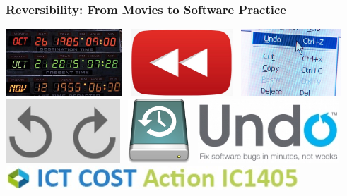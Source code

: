 \documentclass[12pt]{beamer}
\begin{document}
\begin{frame}
\frametitle{Reversibility: From Movies to Software Practice}
\begin{center}
  \includegraphics[height=2.5cm]{./img/bttf2.jpg}~
  \includegraphics[height=2.5cm]{./img/rewind.jpg}~
  \includegraphics[height=2.5cm]{./img/undo.jpg}\\
\includegraphics[height=2.4cm]{./img/undoredo.jpg}~
    \includegraphics[height=2.4cm]{./img/tm.jpg}~
        \includegraphics[height=2.4cm]{./img/debug.jpg} \\
                \includegraphics[width=11cm]{./img/rever.jpg} 
\end{center}
\end{frame}
\end{document}
